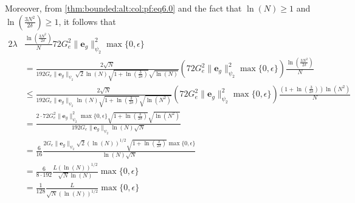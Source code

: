 \documentclass{article}
\newcommand{\e}{\mathbf{e}}
\begin{document}
       Moreover, from \eqref{thm:bounded:alt:col:pf:eq6.0} and the fact that 
       $\ln(N) \ge 1$ and $\ln\left(\frac{3N^2}{2\delta}\right) \ge 1$, it follows that
       \begin{equation}
        \label{thm:bounded:alt:col:pf:eq8}
       \begin{aligned}
         2\lambda & \frac{\ln\left(\frac{3N^2}{2\delta}\right)}{N} 72G^2_e\|\e_g\|_{\psi_2}^2\max\{0,\epsilon\}
          \\
         &= \frac{2\sqrt{N}}{192 G_e\|\e_g\|_{\psi_2} \sqrt{2}\ln(N) \sqrt{1+\ln\left(\frac{3}{2\delta}\right)}\sqrt{\ln(N)}}
            (72G^2_e\|\e_g\|_{\psi_2}^2\max\{0,\epsilon\})\frac{\ln\left(\frac{3N^2}{2\delta}\right)}{N}   \\
        & \leq  \frac{2\sqrt{N}}{192 G_e\|\e_g\|_{\psi_2}\ln(N) \sqrt{1+\ln\left(\frac{3}{2\delta}\right)}\sqrt{\ln(N^2)}}
            (72G^2_e\|\e_g\|_{\psi_2}^2\max\{0,\epsilon\}) \frac{(1+\ln\left(\frac{3}{2\delta}\right))\ln(N^2)}{N} \\
         & = \frac{2 \cdot 72G^2_e\|\e_g\|_{\psi_2}^2\max\{0,\epsilon\}\sqrt{1+\ln\left(\frac{3}{2\delta}\right)}\sqrt{\ln(N^2)}}{192 G_e\|\e_g\|_{\psi_2}\ln(N)\sqrt{N}} \\
         &= 
         \frac{6}{16} \frac{2G_e\|\e_g\|_{\psi_2}\sqrt{2}(\ln(N))^{1/2} \sqrt{1+\ln\left(\frac{3}{2\delta}\right)}\max\{0,\epsilon\}}{\ln(N) \sqrt{N}} \\
         & = \frac{6}{8 \cdot 192} \frac{L (\ln(N))^{1/2}}{\sqrt{N}\ln(N)} \max\{0,\epsilon\}\\ 
          & = \frac{1}{128} \frac{L}{\sqrt{N}(\ln(N))^{1/2}} \max\{0,\epsilon\}
       \end{aligned}
      \end{equation}
\end{document}

